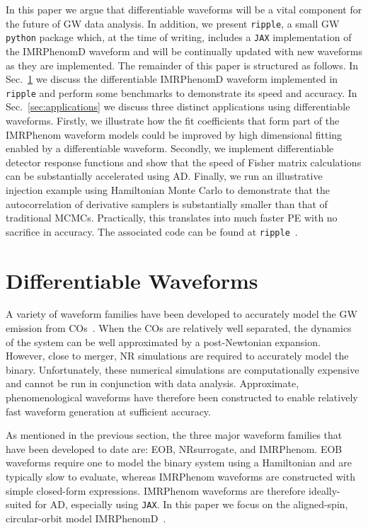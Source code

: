 \documentclass[twocolumn]{aastex631}
\newcommand{\jax}{\texttt{JAX}\xspace}
\newcommand{\ripple}{\texttt{ripple}\xspace}
\begin{document}
In this paper we argue that differentiable waveforms will be a vital component for the future of GW data analysis.
In addition, we present \ripple, a small GW \texttt{python} package which, at the time of writing, includes a \jax implementation of the IMRPhenomD waveform and will be continually updated with new waveforms as they are implemented.
The remainder of this paper is structured as follows. 
In Sec.~\ref{sec:waveforms} we discuss the differentiable IMRPhenomD waveform implemented in \ripple and perform some benchmarks to demonstrate its speed and accuracy. 
In Sec.~\ref{sec:applications} we discuss three distinct applications using differentiable waveforms. 
Firstly, we illustrate how the fit coefficients that form part of the IMRPhenom waveform models could be improved by high dimensional fitting enabled by a differentiable waveform. 
Secondly, we implement differentiable detector response functions and show that the speed of Fisher matrix calculations can be substantially accelerated using AD.
Finally, we run an illustrative injection example using Hamiltonian Monte Carlo to demonstrate that the autocorrelation of derivative samplers is substantially smaller than that of traditional MCMCs.
Practically, this translates into much faster PE with no sacrifice in accuracy.
The associated code can be found at \ripple~\citep{ripple}.

\section{Differentiable Waveforms}
\label{sec:waveforms}

A variety of waveform families have been developed to accurately model the GW emission from COs~\citep{Schmidtreview}. 
When the COs are relatively well separated, the dynamics of the system can be well approximated by a post-Newtonian expansion.
However, close to merger, NR simulations are required to accurately model the binary.
Unfortunately, these numerical simulations are computationally expensive and cannot be run in conjunction with data analysis.
Approximate, phenomenological waveforms have therefore been constructed to enable relatively fast waveform generation at sufficient accuracy.

As mentioned in the previous section, the three major waveform families that have been developed to date are:  EOB,  NRsurrogate, and IMRPhenom.
EOB waveforms require one to model the binary system using a Hamiltonian and are typically slow to evaluate, whereas IMRPhenom waveforms are constructed with simple closed-form expressions.
IMRPhenom waveforms are therefore ideally-suited for AD, especially using \jax. 
In this paper we focus on the aligned-spin, circular-orbit model IMRPhenomD~\citep{Husa:2015iqa, Khan:2015jqa}.
\end{document}
